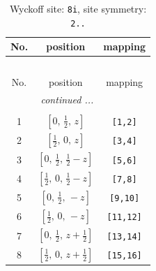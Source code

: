 \documentclass[fleqn,8pt]{jsarticle}
\begin{document}
\renewcommand{\arraystretch}{1.2}
\begin{longtable}{ccc}
\caption{Wyckoff site: {\tt 8i}, site symmetry: {\tt 2..}}
 \\
 \hline \hline
No. & position & mapping \\ \hline \endfirsthead

\multicolumn{2}{l}{\tablename\ \thetable{}} \\
 \hline \hline
No. & position & mapping \\ \hline \endhead

 \hline \hline
\multicolumn{2}{r}{\footnotesize\it continued ...} \\ \endfoot

 \hline \hline
\multicolumn{2}{r}{} \\ \endlastfoot

1 & $\left[ 0,\, \frac{1}{2},\, z \right]$ & {\tt [1,2]} \\ \hline
2 & $\left[ \frac{1}{2},\, 0,\, z \right]$ & {\tt [3,4]} \\ \hline
3 & $\left[ 0,\, \frac{1}{2},\, \frac{1}{2} - z \right]$ & {\tt [5,6]} \\ \hline
4 & $\left[ \frac{1}{2},\, 0,\, \frac{1}{2} - z \right]$ & {\tt [7,8]} \\ \hline
5 & $\left[ 0,\, \frac{1}{2},\, - z \right]$ & {\tt [9,10]} \\ \hline
6 & $\left[ \frac{1}{2},\, 0,\, - z \right]$ & {\tt [11,12]} \\ \hline
7 & $\left[ 0,\, \frac{1}{2},\, z + \frac{1}{2} \right]$ & {\tt [13,14]} \\ \hline
8 & $\left[ \frac{1}{2},\, 0,\, z + \frac{1}{2} \right]$ & {\tt [15,16]} \\
\end{longtable}
\renewcommand{\arraystretch}{1.2}
\end{document}

